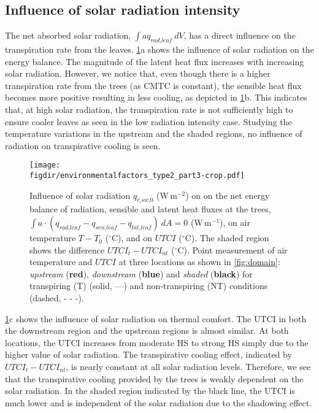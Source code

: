 \subsection{Influence of solar radiation intensity}

The net absorbed solar radiation, $\int a q_{\textit{rad,leaf}}\ dV$, has a direct influence on the transpiration rate from the leaves. \cref{fig:environmentalfactorspart3}a shows the influence of solar radiation on the energy balance. The magnitude of the latent heat flux increases with increasing solar radiation. However, we notice that, even though there is a higher transpiration rate from the trees (as CMTC is constant), the sensible heat flux becomes more positive resulting in less cooling, as depicted in \cref{fig:environmentalfactorspart3}b. This indicates that, at high solar radiation, the transpiration rate is not sufficiently high to ensure cooler leaves as seen in the low radiation intensity case. Studying the temperature variations in the upstream and the shaded regions, no influence of radiation on transpirative cooling is seen. 
	
\begin{figure}[t]
	\centering
	\texttt{[image: \\figdir/environmentalfactors\_type2\_part3-crop.pdf]}
	\caption{Influence of solar radiation $q_{\textit{r,sw,0}}$ (W\,m$^{-2}$) on  on the net energy balance of radiation, sensible and latent heat fluxes at the trees, $\int a \cdot (q_{\textit{rad,leaf}}-q_{\textit{sen,leaf}}-q_{\textit{lat,leaf}})\ dA = 0$ (W\,m$^{-1}$),  on air temperature $T-T_0$ ($^{\circ}$C), and  on $\textit{UTCI}$ ($^{\circ}$C). The shaded region shows the difference $\textit{UTCI}_t-\textit{UTCI}_{\textit{nt}}$ ($^{\circ}$C). Point measurement of air temperature and $UTCI$ at three locations as shown in \cref{fig:domain}: \textit{upstream} ({\color{flatuidarkred}\textbf{red}}), \textit{downstream} ({\color{flatuidarkblue}\textbf{blue}}) and \textit{shaded} (\textbf{black}) for transpiring (T) (solid, ---) and non-transpiring (NT) conditions (dashed, - - -).}
	\label{fig:environmentalfactorspart3}
\end{figure}

\cref{fig:environmentalfactorspart3}c shows the influence of solar radiation on thermal comfort. The UTCI in both the downstream region and the upstream regions is almost similar. At both locations, the UTCI increases from moderate HS to strong HS simply due to the higher value of solar radiation. The transpirative cooling effect, indicated by $\textit{UTCI}_t-\textit{UTCI}_{\textit{nt}}$, is nearly constant at all solar radiation levels. Therefore, we see that the transpirative cooling provided by the trees is weakly dependent on the solar radiation. In the shaded region indicated by the black line, the UTCI is much lower and is independent of the solar radiation due to the shadowing effect. 

